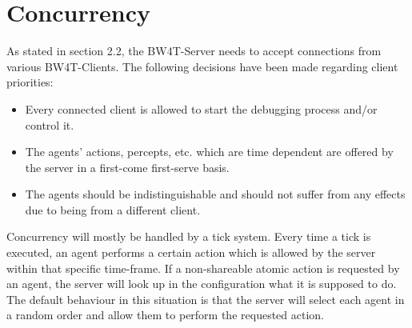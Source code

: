 \section{Concurrency}
As stated in section 2.2, the BW4T-Server needs to accept connections from
various BW4T-Clients. The following decisions have been made regarding client
priorities:

\begin{itemize}
  \item Every connected client is allowed to start the debugging process and/or
    control it.
  \item The agents' actions, percepts, etc. which are time dependent are
    offered by the server in a first-come first-serve basis.
  \item The agents should be indistinguishable and should not suffer from any
    effects due to being from a different client.
\end{itemize}

Concurrency will mostly be handled by a tick system. Every time a tick is
executed, an agent performs a certain action which is allowed by the server
within that specific time-frame. If a non-shareable atomic action is requested
by an agent, the server will look up in the configuration what it is supposed
to do. The default behaviour in this situation is that the server will select each agent 
in a random order and allow them to perform the requested action.
